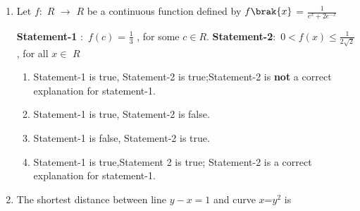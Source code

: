 \documentclass[journal,12pt,onecolumn]{IEEEtran}
\theoremstyle{remark}
\begin{document}
\begin{enumerate}
\begin{multicols}{4}
        
        \begin{enumerate}
        
            
        
        \item 0
        \item -$\frac{1}{2}$
        \item -1
        \item 1
        
        \end{enumerate}
        \end{multicols}
            
     \item Let $f$$\colon$ $R$ $\to$ $R$ be a continuous function defined by $f\brak{x}$ = $\frac{1}{e^x + 2e^{-x}}$ \hfill{}
      
        \begin{enumerate}
    
            
        
            
            \textbf{Statement-1} $\colon$ $f(c)$ = $\frac{1}{3}$ , for some $c$$\in$$R$.
            \textbf{Statement-2}$\colon$ 0$<$$f(x)$$\leq$$\frac{1}{2\sqrt{2}}$, for all $x$$\in$ $R$
            
       
        \end{enumerate}
         
            \begin{enumerate}
            
                
            
                \item Statement-1 is true, Statement-2 is true;Statement-2 is \textbf{not} a correct explanation for statement-1. 
        \item Statement-1 is true, Statement-2 is false.  
        \item Statement-1 is false, Statement-2 is true.  
        \item Statement-1 is true,Statement 2 is true; Statement-2 is a correct explanation for statement-1. 
    
        
            \end{enumerate}
           
            
            \item The shortest distance between line $y-x=1$ and curve $x$=$y^2$ is \hfill{}
             \begin{multicols}{4}
            \begin{enumerate}
            

\end{enumerate}
\end{multicols}
\end{enumerate}
\end{document}
